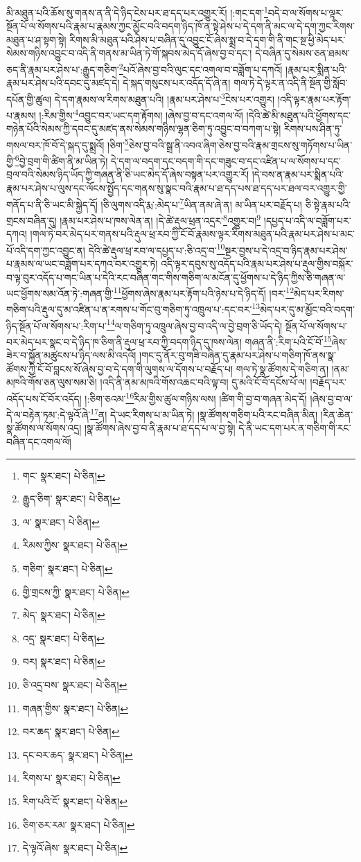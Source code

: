 མི་མཐུན་པའི་ཆོས་སུ་གནས་ན་ནི་དེ་ཉིད་ངེས་པར་ཐ་དད་པར་འགྱུར་རོ། །:གང་དག་\footnote{གང་  སྣར་ཐང་།  པེ་ཅིན། }བདེ་བ་ལ་སོགས་པ་ལྟར་སྔོན་པོ་ལ་སོགས་པའི་རྣམ་པ་རྣམས་ཀྱང་མྱོང་བའི་བདག་ཉིད་ཁོ་ན་སྟེ་ཤེས་པ་དེ་དག་ནི་མང་ལ་དེ་དག་ཀྱང་རིགས་མཐུན་པ་ཤ་སྟག་སྟེ། རིགས་མི་མཐུན་པའི་ཤེས་པ་བཞིན་དུ་འབྱུང་ངོ་ཞེས་སྨྲ་བ་དེ་དག་གི་ནི་གང་སྔ་ཕྱི་མེད་པར་སེམས་གཉིས་འབྱུང་བ་འདི་ནི་གནས་མ་ཡིན་ཏེ་གོ་སྐབས་མེད་དོ་ཞེས་བྱ་བ་དང་། དེ་བཞིན་དུ་སེམས་ཅན་ཐམས་ཅད་ནི་རྣམ་པར་ཤེས་པ་:རྒྱུད་གཅིག་\footnote{རྒྱུད་ཅིག་  སྣར་ཐང་།  པེ་ཅིན། }པའོ་ཞེས་བྱ་བའི་ལུང་དང་འགལ་བ་བཟློག་པ་དཀའོ། །རྣམ་པར་སྨིན་པའི་རྣམ་པར་ཤེས་པའི་དབང་དུ་མཛད་དེ། དེ་སྐད་གསུངས་པར་འདོད་དོ་ཞེ་ན། གལ་ཏེ་དེ་ལྟར་ན་འདི་ནི་སྔོན་གྱི་སློབ་དཔོན་གྱི་ཚུལ། དེ་དག་རྣམས་ལ་རིགས་མཐུན་པའི། །རྣམ་པར་ཤེས་པ་\footnote{ལ་  སྣར་ཐང་།  པེ་ཅིན། }ངེས་པར་འགྱུར། །འདི་ལྟར་རྣམ་པར་རྟོག་པ་རྣམས། །:རིམ་གྱིས་\footnote{རིམས་ཀྱིས་  སྣར་ཐང་།  པེ་ཅིན། }འབྱུང་བར་ཡང་དག་རྟོགས། །ཞེས་བྱ་བ་དང་འགལ་ལོ། །དེའི་ཚེ་མི་མཐུན་པའི་ཕྱོགས་དང་གཉེན་པོའི་སེམས་ཀྱི་དབང་དུ་མཛད་ནས་སེམས་གཉིས་ལྷན་ཅིག་ཏུ་འབྱུང་བ་བཀག་པ་སྟེ། རིགས་པས་ཤིན་ཏུ་གསལ་བར་ཁོ་བོ་དེ་སྐད་དུ་སྨྲའོ། །ཅིག་\footnote{གཅིག་  སྣར་ཐང་།  པེ་ཅིན། }ཅེས་བྱ་བའི་སྒྲ་ནི་འབའ་ཞིག་ཅེས་བྱ་བའི་རྣམ་གྲངས་སུ་གཏོགས་པ་ཡིན་གྱི་\footnote{གྱི་གྲངས་ཀྱི་  སྣར་ཐང་།  པེ་ཅིན། }བྱེ་བྲག་གི་ཚིག་ནི་མ་ཡིན་ཏེ། དེ་དག་ལ་བདག་དང་བདག་གི་དང་གཟུང་བ་དང་འཛིན་པ་ལ་སོགས་པ་དང་བྲལ་བའི་སེམས་ཉིད་ཡོད་ཀྱི་གཞན་ནི་ཅི་ཡང་མེད་དོ་ཞེས་བསྟན་པར་འགྱུར་རོ། །དེ་བས་ན་རྣམ་པར་སྨིན་པའི་རྣམ་པར་ཤེས་པ་ལུས་དང་ལོངས་སྤྱོད་དང་གནས་སུ་སྣང་བའི་རྣམ་པ་ཐ་དད་པས་ཐ་དད་པར་ཐལ་བར་འགྱུར་གྱི་གནོད་པ་ནི་ཅི་ཡང་མི་སྐྱེད་དོ། །ཅི་ལུགས་འདི་རྨ་:མེད་པ་\footnote{མེད་  སྣར་ཐང་།  པེ་ཅིན། }ཡིན་ནམ་ཞེ་ན། མ་ཡིན་པར་བརྗོད་པ། ཅི་སྟེ་རྣམ་པའི་གྲངས་བཞིན་དུ། །རྣམ་པར་ཤེས་པ་ཁས་ལེན་ན། །དེ་ཚེ་རྡུལ་ཕྲན་འདྲར་\footnote{འདྲ་  སྣར་ཐང་།  པེ་ཅིན། }འགྱུར་བ།\footnote{བར།  སྣར་ཐང་།  པེ་ཅིན། } །དཔྱད་པ་འདི་ལ་བཟློག་པར་དཀའ། །གལ་ཏེ་བར་མེད་པར་གནས་པའི་རྡུལ་ཕྲ་རབ་ཀྱི་ངོ་བོ་རྣམས་ལྟར་རིགས་མཐུན་པའི་རྣམ་པར་ཤེས་པ་མང་པོ་འདི་དག་ཀྱང་འབྱུང་ན། དེའི་ཚེ་རྡུལ་ཕྲ་རབ་ལ་དཔྱད་པ་:ཅི་འདྲ་བ་\footnote{ཅི་འདྲ་བས་  སྣར་ཐང་།  པེ་ཅིན། }སྔར་བྱས་པ་དེ་འདྲ་བ་ཉིད་རྣམ་པར་ཤེས་པ་རྣམས་ལ་ཡང་བཟློག་པར་དཀའ་བར་འགྱུར་ཏེ། འདི་ལྟར་དབུས་སུ་འདོད་པའི་རྣམ་པར་ཤེས་པ་རྡུལ་གྱིས་བསྐོར་བ་ལྟ་བུར་འདོད་པ་གང་ཡིན་པ་དེའི་རང་བཞིན་གང་གིས་གཅིག་ལ་མངོན་དུ་ཕྱོགས་པ་དེ་ཉིད་ཀྱིས་ཅི་གཞན་ལ་ཡང་ཕྱོགས་སམ་འོན་ཏེ་:གཞན་གྱི་\footnote{གཞན་གྱིས་  སྣར་ཐང་།  པེ་ཅིན། }ཕྱོགས་ཞེས་རྣམ་པར་རྟོག་པའི་ཉེས་པ་དེ་ཉིད་དོ། །བར་\footnote{བར་ཆད་  སྣར་ཐང་།  པེ་ཅིན། }མེད་པར་རིགས་གཅིག་པའི་རྡུལ་དུ་མ་འཛིན་པ་ན་རགས་པ་གོང་བུ་གཅིག་ཏུ་འཁྲུལ་པ་:དང་བར་\footnote{དང་བར་ཆད་  སྣར་ཐང་།  པེ་ཅིན། }མེད་པར་དུ་མ་མྱོང་བའི་བདག་ཉིད་སྔོན་པོ་ལ་སོགས་པ་:རིག་པ་\footnote{རིགས་པ་  སྣར་ཐང་།  པེ་ཅིན། }ལ་གཅིག་ཏུ་འཁྲུལ་ཞེས་བྱ་བ་འདི་ལ་བྱེ་བྲག་ཅི་ཡོད་དེ། སྔོན་པོ་ལ་སོགས་པ་བར་མེད་པར་སྣང་བ་དེ་ཉིད་ཁ་ཅིག་ནི་རྡུལ་ཕྲ་རབ་ཀྱི་བདག་ཉིད་དུ་ཁས་ལེན། གཞན་ནི་:རིག་པའི་ངོ་བོ་\footnote{རིག་པའི་ངོ་  སྣར་ཐང་།  པེ་ཅིན། }ཞེས་ཟེར་བ་སྐྱོན་མཚུངས་པ་ཉིད་ལས་མི་འདའོ། །གང་དུ་ནོར་བུ་གཟི་བཞིན་དུ་རྣམ་པར་ཤེས་པ་གཅིག་ཁོ་ནས་སྣ་ཚོགས་ཀྱི་ངོ་བོ་བླངས་སོ་ཞེས་བྱ་བ་དེ་དག་གི་ལུགས་ལ་དོགས་པ་བརྗོད་པ། གལ་ཏེ་སྣ་ཚོགས་དེ་གཅིག་ན། །ནམ་མཁའི་གོས་ཅན་ལུས་སམ་ཅི། །འདི་ནི་ནམ་མཁའི་གོས་འཆང་བའི་ལྟ་བ། དུ་མའི་ངོ་བོ་དངོས་པོ་ལ། །བརྗོད་པར་འདོད་པས་ངོ་བོར་འདོད། །:ཅིག་ཅའམ་\footnote{ཅིག་ཅར་རམ་  སྣར་ཐང་།  པེ་ཅིན། }རིམ་གྱིས་ཚུལ་གཉིས་ལས། །ཚིག་གི་བྱ་བ་གཞན་མེད་དོ། །ཞེས་བྱ་བ་ལ་དེ་ལ་བརྟེན་ཏམ་:དེ་ལྟའོ་ཞེ་\footnote{དེ་ལྟའོ་ཞེས་  སྣར་ཐང་།  པེ་ཅིན། }ན། དེ་ཡང་རིགས་པ་མ་ཡིན་ཏེ། །སྣ་ཚོགས་གཅིག་པའི་རང་བཞིན་མིན། །རིན་ཆེན་སྣ་ཚོགས་ལ་སོགས་འདྲ། །སྣ་ཚོགས་ཞེས་བྱ་བ་ནི་རྣམ་པ་ཐ་དད་པ་ལ་བྱ་སྟེ། དེ་ནི་ཡང་དག་པར་ན་གཅིག་གི་རང་བཞིན་དང་འགལ་ལོ། 